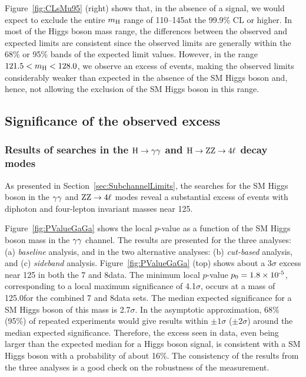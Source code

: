\documentclass[12pt,twoside,a4paper,cmspaper,final,collab]{cms-tdr}
\begin{document}
Figure~\ref{fig:CLsMu95} (right) shows that,
in the absence of a signal, we would expect to exclude
the entire $m_{\mathrm{H}}$ range of 110--145\GeV at the 99.9\% CL or higher.
In most of the Higgs boson mass range,
the differences between the observed and expected limits are consistent
since the observed limits are generally within the
68\% or 95\% bands of the expected limit values.
However, in the range ${\relax121.5} < m_{\mathrm{H}}< {\relax128.0}$\GeV, we observe an excess of events,
making the observed limits considerably weaker than expected in the absence of the SM Higgs boson
and, hence, not allowing the exclusion of the SM Higgs boson in this range.







\subsection{Significance of the observed excess}

\subsubsection{Results of searches in the $\mathrm{H} \to \gamma\gamma$ and $\mathrm{H} \to \mathrm{Z}\mathrm{Z} \to 4\ell$ decay  modes}
\label{sec:SubchannelSignificance}

As presented in Section~\ref{sec:SubchannelLimits},
the searches for the SM Higgs boson in the $\gamma\gamma$ and $ \mathrm{Z}\mathrm{Z} \to 4\ell$ modes
reveal a substantial excess of events with diphoton and four-lepton invariant masses near 125\GeV.

Figure~\ref{fig:PValueGaGa} shows the local $p$-value as a function of the SM Higgs boson mass
in the $\gamma\gamma$ channel.
The results are presented for the three analyses:
(a) \emph{baseline} analysis,  and in the two alternative analyses:
(b) \emph{cut-based} analysis,
and (c) \emph{sideband} analysis.
Figure~\ref{fig:PValueGaGa} (top) shows about a $3\sigma$ excess near 125\GeV
in both the 7 and 8\TeV data.
The minimum local $p$-value $p_0 = 1.8\times \text{10}^\text{-5}$, corresponding to a local
maximum significance of 4.1$\sigma$, occurs at a mass of 125.0\GeV for the combined 7 and 8\TeV data sets.
The median expected significance for a SM Higgs boson of this mass
is 2.7$\sigma$. In the asymptotic approximation, 68\% (95\%) of repeated experiments would
give results within ${\pm}1 \sigma$ (${\pm}2 \sigma$) around the median expected
significance. Therefore, the excess seen in data, even being larger than the expected  median for a Higgs boson signal,
is consistent with a SM Higgs boson with a probability
of about 16\%.
The consistency of the results from the three analyses is a good check on the robustness
of the measurement.
\end{document}
